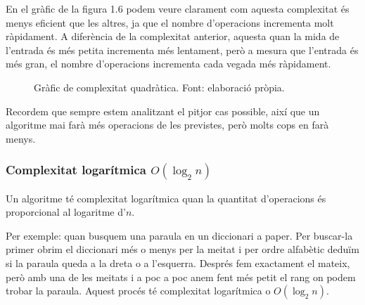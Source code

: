 En el gràfic de la figura 1.6 podem veure clarament com aquesta complexitat és menys eficient que les altres, ja que el nombre d'operacions incrementa molt ràpidament. A diferència de la complexitat anterior, aquesta quan la mida de l'entrada és més petita incrementa més lentament, però a mesura que l'entrada és més gran, el nombre d'operacions incrementa cada vegada més ràpidament. 
\begin{figure}[h]
    \centering
    \caption[Gràfic de complexitat quadràtica.]{Gràfic de complexitat quadràtica. Font: elaboració pròpia.}
    \label{fig:my_label}
\end{figure}


Recordem que sempre estem analitzant el pitjor cas possible, així que un algoritme mai farà més operacions de les previstes, però molts cops en farà menys.

\subsubsection*{Complexitat logarítmica $O(\log_2{n})$}
Un algoritme té complexitat logarítmica quan la quantitat d'operacions és proporcional al logaritme d'$n$.

Per exemple: quan busquem una paraula en un diccionari a paper. Per buscar-la primer obrim el diccionari més o menys per la meitat i per ordre alfabètic deduïm si la paraula queda a la dreta o a l'esquerra. Després fem exactament el mateix, però amb una de les meitats i a poc a poc anem fent més petit el rang on podem trobar la paraula. Aquest procés té complexitat logarítmica o $O(\log_2{n})$.

